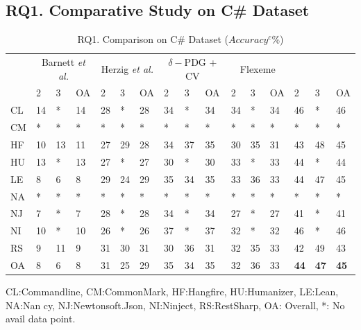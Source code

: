 \subsection{RQ1. Comparative Study on C\# Dataset}
\label{rq1:sec}

\begin{table}[t]
	\caption{RQ1. Comparison on C\# Dataset ($Accuracy^c$\%)}
	\vspace{-0.1in}
	\begin{center}
		\footnotesize
		\tabcolsep 4pt
		\renewcommand{\arraystretch}{1} \begin{tabular}{p{0.2cm}<{\centering}|p{0.25cm}<{\centering}p{0.25cm}<{\centering}p{0.25cm}<{\centering}|p{0.25cm}<{\centering}p{0.25cm}<{\centering}p{0.25cm}<{\centering}|p{0.25cm}<{\centering}p{0.25cm}<{\centering}p{0.25cm}<{\centering}|p{0.25cm}<{\centering}p{0.25cm}<{\centering}p{0.25cm}<{\centering}|p{0.25cm}<{\centering}p{0.25cm}<{\centering}p{0.25cm}<{\centering}}
			
			\hline
		\multirow{2}{*}{}          & \multicolumn{3}{c|}{Barnett {\em et al.}} & \multicolumn{3}{c|}{Herzig {\em et al.}} & \multicolumn{3}{c|}{$\delta-$PDG + CV} & \multicolumn{3}{c|}{Flexeme} & \multicolumn{3}{c}{\bf {\tool}}\\
		\cline{2-16}
		 & 2 & 3 & OA & 2 & 3 & OA & 2 & 3 & OA & 2 & 3 & OA & 2 & 3 & OA \\
			\hline
			CL   & 14 & *    & 14 & 28 & *    & 28 & 34 & *    & 34 & 34 & *    & 34 & 46 & *    & 46 \\
			CM   & *    & *    & *    & *    & *    & *    & *    & *    & *    & *    & *    & *    & *    & *    & *    \\
			HF   & 10 & 13 & 11 & 27 & 29 & 28 & 34 & 37 & 35 & 30 & 35 & 31 & 43 & 48 & 45 \\
			HU   & 13 & *    & 13 & 27 & *    & 27 & 30 & *    & 30 & 33 & *    & 33 & 44 & *    & 44 \\
			LE   & 8 & 6 & 8 & 29 & 24 & 29 & 35 & 34 & 35 & 33 & 36 & 33 & 44 & 47 & 45\\
			NA   & *    & *    & *    & *    & *    & *    & *    & *    & *    & *    & *    & *    & *    & *    & *    \\
			NJ   & 7 & *    & 7 & 28 & *    & 28 & 34 & *    & 34 & 27 & *    & 27 & 41 & *    & 41 \\
			NI   & 10 & *    & 10 & 26 & *    & 26 & 37 & *    & 37 & 32 & *    & 32 & 46 & *    & 46 \\
			RS   & 9 & 11 & 9 & 31 & 30 & 31 & 30 & 36 & 31 & 32 & 35 & 33 & 42 & 49 & 43\\
			\hline
			OA   & 8 & 6 & 8 & 31 & 25 & 29 & 35 & 34 & 35 & 32 & 36 & 33 & {\bf 44} & {\bf 47} & {\bf 45} \\
			\hline
		\end{tabular}
		\label{RQ1-result-1}
		CL:Commandline, CM:CommonMark, HF:Hangfire, HU:Humanizer, LE:Lean, NA:Nan cy, NJ:Newtonsoft.Json, NI:Ninject, RS:RestSharp, OA: Overall, *: No avail data point.
	\end{center}
\end{table}

